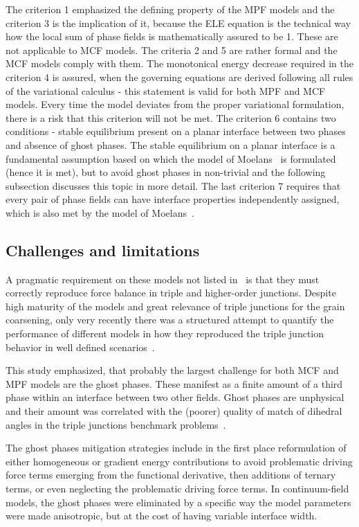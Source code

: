 	The criterion 1 emphasized the defining property of the MPF models and the criterion 3 is the implication of it, because the ELE equation is the technical way how the local sum of phase fields is mathematically assured to be 1. These are not applicable to MCF models. The criteria 2 and 5 are rather formal and the MCF models comply with them. The monotonical energy decrease required in the criterion 4 is assured, when the governing equations are derived following all rules of the variational calculus - this statement is valid for both MPF and MCF models. Every time the model deviates from the proper variational formulation, there is a risk that this criterion will not be met. The criterion 6 contains two conditions - stable equilibrium present on a planar interface between two phases and absence of ghost phases. The stable equilibrium on a planar interface is a fundamental assumption based on which the model of Moelans~\cite{Moelans2008, Minar2022} is formulated (hence it is met), but to avoid ghost phases in non-trivial and the following subsection discusses this topic in more detail. The last criterion 7 requires that every pair of phase fields can have interface properties independently assigned, which is also met by the model of Moelans~\cite{Moelans2008}.

	\subsection{Challenges and limitations}
	A pragmatic requirement on these models not listed in~\cite{Toth2015} is that they must correctly reproduce force balance in triple and higher-order junctions. Despite high maturity of the models and great relevance of triple junctions for the grain coarsening, only very recently there was a structured attempt to quantify the performance of different models in how they reproduced the triple junction behavior in well defined scenarios~\cite{Daubner2023}. 
	
	This study emphasized, that probably the largest challenge for both MCF and MPF models are the ghost phases. These manifest as a finite amount of a third phase within an interface between two other fields. Ghost phases are unphysical and their amount was correlated with the (poorer) quality of match of dihedral angles in the triple junctions benchmark problems~\cite{Daubner2023}. 
	
	The ghost phases mitigation strategies include in the first place reformulation of either homogeneous or gradient energy contributions to avoid problematic driving force terms emerging from the functional derivative, then additions of ternary terms, or even neglecting the problematic driving force terms. In continuum-field models, the ghost phases were eliminated by a specific way the model parameters were made anisotropic, but at the cost of having variable interface width. 
	
